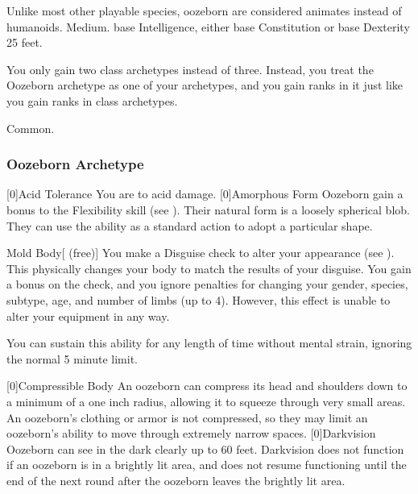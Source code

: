          Unlike most other playable species, oozeborn are considered animates instead of humanoids.
         Medium.
          base Intelligence, either  base Constitution or  base Dexterity
         25 feet.
        \begin{itemize}
             You only gain two class archetypes instead of three.
                Instead, you treat the Oozeborn archetype as one of your archetypes, and you gain ranks in it just like you gain ranks in class archetypes.
        \end{itemize}
         Common.
        
        \subsubsection{Oozeborn Archetype}
            [0]{Acid Tolerance} You are  to acid damage.
            [0]{Amorphous Form} Oozeborn gain a  bonus to the Flexibility skill (see ).
                Their natural form is a loosely spherical blob.
                They can use the  ability as a standard action to adopt a particular shape.
                \begin{durationability}{Mold Body}[ (free)]
                    You make a Disguise check to alter your appearance (see ).
                    This physically changes your body to match the results of your disguise.
                    You gain a  bonus on the check, and you ignore penalties for changing your gender, species, subtype, age, and number of limbs (up to 4).
                    However, this effect is unable to alter your equipment in any way.

                    You can sustain this ability for any length of time without mental strain, ignoring the normal 5 minute limit.
                \end{durationability}
            [0]{Compressible Body} An oozeborn can compress its head and shoulders down to a minimum of a one inch radius, allowing it to squeeze through very small areas.
                An oozeborn's clothing or armor is not compressed, so they may limit an oozeborn's ability to move through extremely narrow spaces.
            [0]{Darkvision} Oozeborn can see in the dark clearly up to 60 feet.
                Darkvision does not function if an oozeborn is in a brightly lit area, and does not resume functioning until the end of the next round after the oozeborn leaves the brightly lit area.

